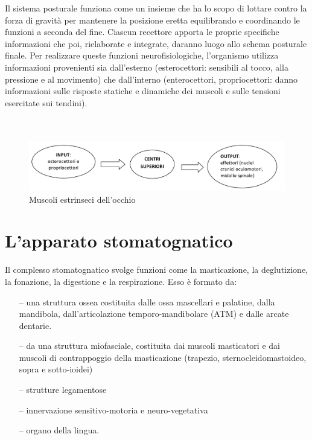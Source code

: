  Il sistema posturale funziona come un insieme che ha lo scopo di lottare contro la forza di gravità per mantenere la posizione eretta equilibrando e coordinando le funzioni a seconda del fine. Ciascun recettore apporta le proprie specifiche informazioni che poi, rielaborate e integrate, daranno luogo allo schema posturale finale. Per realizzare queste funzioni neurofisiologiche, l’organismo utilizza informazioni provenienti sia dall’esterno (esterocettori: sensibili al tocco, alla pressione e al movimento) che dall’interno (enterocettori, propriocettori: danno informazioni sulle risposte statiche e dinamiche dei muscoli e sulle tensioni esercitate sui tendini).
 \\\ \\\
 \begin{figure}[h!]
	\centering
	\includegraphics[scale=0.4]{source/immagini/STP.png}
	\caption[figure]{Muscoli estrinseci dell'occhio}
	\label{fig:issuexample}
\end{figure}


\section{L'apparato stomatognatico}

Il complesso stomatognatico svolge funzioni come la masticazione, la deglutizione, la fonazione, la digestione e la respirazione. Esso è formato da:
\begin{itemize}
 \itemsep-0.5em 
 \item[--]una struttura ossea costituita dalle ossa mascellari e palatine, dalla mandibola, dall’articolazione temporo-mandibolare (ATM) e dalle arcate dentarie.
 \item[--]da una struttura miofasciale, costituita  dai muscoli masticatori e dai muscoli di contrappoggio della masticazione (trapezio, sternocleidomastoideo, sopra e sotto-ioidei)
 \item[--]strutture legamentose
 \item[--]innervazione sensitivo-motoria e neuro-vegetativa
 \item[--]organo della lingua.
 \end{itemize}
 
